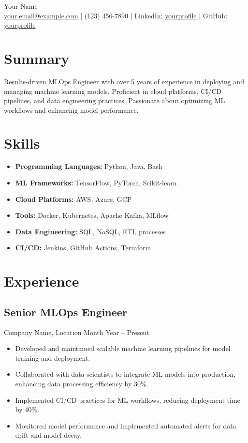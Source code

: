 \documentclass[a4paper,10pt]{article}
\begin{document}
\begin{center}
    {\LARGE Your Name} \\
    \vspace{2mm}
    \href{mailto:your.email@example.com}{your.email@example.com} | (123) 456-7890 | LinkedIn: \href{https://www.linkedin.com/in/yourprofile}{yourprofile} | GitHub: \href{https://github.com/yourprofile}{yourprofile}
\end{center}

\section*{Summary}
Results-driven MLOps Engineer with over 5 years of experience in deploying and managing machine learning models. Proficient in cloud platforms, CI/CD pipelines, and data engineering practices. Passionate about optimizing ML workflows and enhancing model performance.

\section*{Skills}
\begin{itemize}[leftmargin=*]
    \item \textbf{Programming Languages:} Python, Java, Bash
    \item \textbf{ML Frameworks:} TensorFlow, PyTorch, Scikit-learn
    \item \textbf{Cloud Platforms:} AWS, Azure, GCP
    \item \textbf{Tools:} Docker, Kubernetes, Apache Kafka, MLflow
    \item \textbf{Data Engineering:} SQL, NoSQL, ETL processes
    \item \textbf{CI/CD:} Jenkins, GitHub Actions, Terraform
\end{itemize}

\section*{Experience}

\subsection*{Senior MLOps Engineer}
Company Name, Location \hfill Month Year -- Present
\begin{itemize}[leftmargin=*]
    \item Developed and maintained scalable machine learning pipelines for model training and deployment.
    \item Collaborated with data scientists to integrate ML models into production, enhancing data processing efficiency by 30\%.
    \item Implemented CI/CD practices for ML workflows, reducing deployment time by 40\%.
    \item Monitored model performance and implemented automated alerts for data drift and model decay.
\end{itemize}
\end{document}
